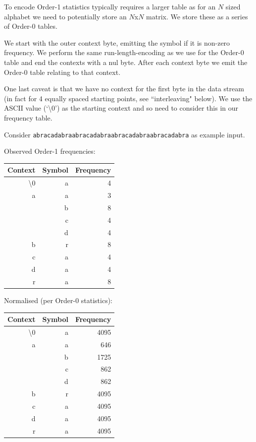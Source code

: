 \documentclass[a4paper]{article}
\begin{document}
To encode Order-1 statistics typically requires a larger table as for
an $N$ sized alphabet we need to potentially store an $N$x$N$ matrix.
We store these as a series of Order-0 tables.

We start with the outer context byte, emitting the symbol if it is
non-zero frequency.  We perform the same run-length-encoding as we
use for the Order-0 table and end the contexts with a nul byte.  After
each context byte we emit the Order-0 table relating to that context.

One last caveat is that we have no context for the first byte in the
data stream (in fact for 4 equally spaced starting points, see
``interleaving" below).  We use the ASCII value (`\textbackslash0') as
the starting context and so need to consider this in our frequency
table.

Consider \texttt{abracadabraabracadabraabracadabraabracadabra} as
example input.

\begin{minipage}[t]{0.5\textwidth}
Observed Order-1 frequencies:
\\[8pt]
\begin{tabular}{ |r|r|r| }
\hline
Context & Symbol & Frequency\\
\hline
\textbackslash0 & a & 4 \\
\hline
a & a & 3 \\
  & b & 8 \\
  & c & 4 \\
  & d & 4 \\
\hline
b & r & 8 \\
\hline
c & a & 4 \\
\hline
d & a & 4 \\
\hline
r & a & 8 \\
\hline
\end{tabular}
\end{minipage}
\begin{minipage}[t]{0.5\textwidth}
Normalised (per Order-0 statistics):
\\[8pt]
\begin{tabular}{ |r|r|r|}
\hline
Context & Symbol & Frequency\\
\hline
\textbackslash0 & a & 4095 \\
\hline
a & a &  646 \\
  & b & 1725 \\
  & c &  862 \\
  & d &  862 \\
\hline
b & r & 4095 \\
\hline
c & a & 4095 \\
\hline
d & a & 4095 \\
\hline
r & a & 4095 \\
\hline
\end{tabular}
\end{minipage}
\end{document}
